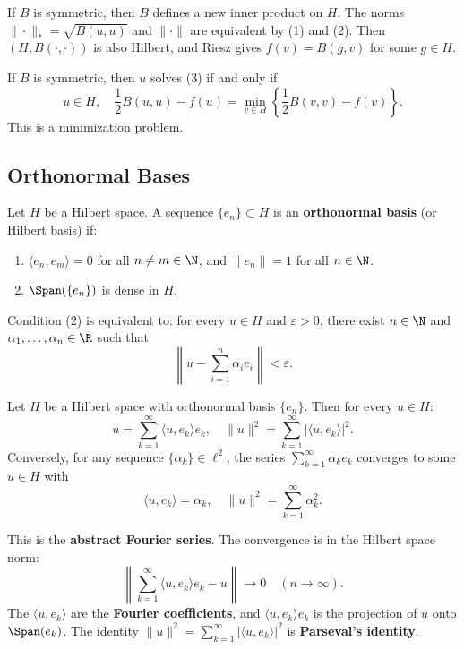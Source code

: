 \begin{remark}
If $B$ is symmetric, then $B$ defines a new inner product on $H$. The norms $\|\cdot\|_* = \sqrt{B(u,u)}$ and $\|\cdot\|$ are equivalent by (1) and (2). Then $(H, B(\cdot, \cdot))$ is also Hilbert, and Riesz gives $f(v) = B(g,v)$ for some $g \in H$.
\end{remark}

\begin{remark}
If $B$ is symmetric, then $u$ solves (3) if and only if
\[
u \in H, \quad \frac{1}{2} B(u,u) - f(u) = \min_{v \in H} \left\{ \frac{1}{2} B(v,v) - f(v) \right\}.
\]
This is a minimization problem.
\end{remark}

\subsection{Orthonormal Bases}

\begin{definition}
Let $H$ be a Hilbert space. A sequence $\{e_n\} \subset H$ is an \textbf{orthonormal basis} (or Hilbert basis) if:
\begin{enumerate}
\item $\langle e_n, e_m \rangle = 0$ for all $n \neq m \in \N$, and $\|e_n\| = 1$ for all $n \in \N$.
\item $\Span(\{e_n\})$ is dense in $H$.
\end{enumerate}
\end{definition}

\begin{remark}
Condition (2) is equivalent to: for every $u \in H$ and $\varepsilon > 0$, there exist $n \in \N$ and $\alpha_1, \dots, \alpha_n \in \R$ such that
\[
\left\| u - \sum_{i=1}^n \alpha_i e_i \right\| < \varepsilon.
\]
\end{remark}

\begin{theorem}
Let $H$ be a Hilbert space with orthonormal basis $\{e_n\}$. Then for every $u \in H$:
\[
u = \sum_{k=1}^\infty \langle u, e_k \rangle e_k, \quad \|u\|^2 = \sum_{k=1}^\infty |\langle u, e_k \rangle|^2.
\]
Conversely, for any sequence $\{\alpha_k\} \in \ell^2$, the series $\sum_{k=1}^\infty \alpha_k e_k$ converges to some $u \in H$ with
\[
\langle u, e_k \rangle = \alpha_k, \quad \|u\|^2 = \sum_{k=1}^\infty \alpha_k^2.
\]
\end{theorem}

\begin{remark}
This is the \textbf{abstract Fourier series}. The convergence is in the Hilbert space norm:
\[
\left\| \sum_{k=1}^\infty \langle u, e_k \rangle e_k - u \right\| \to 0 \quad (n \to \infty).
\]
The $\langle u, e_k \rangle$ are the \textbf{Fourier coefficients}, and $\langle u, e_k \rangle e_k$ is the projection of $u$ onto $\Span(e_k)$. The identity $\|u\|^2 = \sum_{k=1}^\infty |\langle u, e_k \rangle|^2$ is \textbf{Parseval's identity}.
\end{remark}

